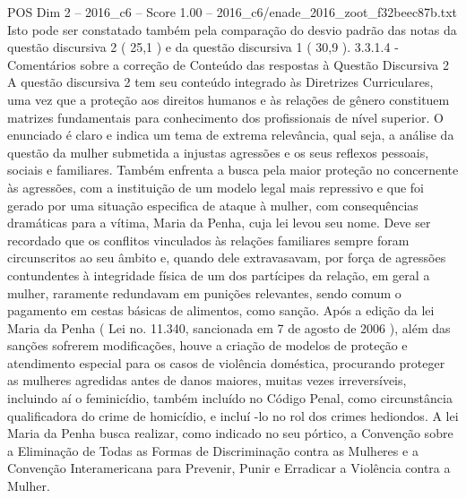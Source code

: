 \begin{textsample}{POS Dim 2 – 2016\_c6 – Score 1.00 – 2016\_c6/enade\_2016\_zoot\_f32beec87b.txt}
Isto pode ser constatado também pela comparação do desvio padrão das notas da questão discursiva 2 ( 25,1 ) e da questão discursiva 1 ( 30,9 ). 3.3.1.4 - Comentários sobre a correção de Conteúdo das respostas à Questão Discursiva 2 A questão discursiva 2 tem seu conteúdo integrado às Diretrizes Curriculares, uma vez que a proteção aos direitos humanos e às relações de gênero constituem matrizes fundamentais para conhecimento dos profissionais de nível superior.
O enunciado é claro e indica um tema de extrema relevância, qual seja, a análise da questão da mulher submetida a injustas agressões e os seus reflexos pessoais, sociais e familiares.
Também enfrenta a busca pela maior proteção no concernente às agressões, com a instituição de um modelo legal mais repressivo e que foi gerado por uma situação especifica de ataque à mulher, com consequências dramáticas para a vítima, Maria da Penha, cuja lei levou seu nome.
Deve ser recordado que os conflitos vinculados às relações familiares sempre foram circunscritos ao seu âmbito e, quando dele extravasavam, por força de agressões contundentes à integridade física de um dos partícipes da relação, em geral a mulher, raramente redundavam em punições relevantes, sendo comum o pagamento em cestas básicas de alimentos, como sanção.
Após a edição da lei Maria da Penha ( Lei no. 11.340, sancionada em 7 de agosto de 2006 ), além das sanções sofrerem modificações, houve a criação de modelos de proteção e atendimento especial para os casos de violência doméstica, procurando proteger as mulheres agredidas antes de danos maiores, muitas vezes irreversíveis, incluindo aí o feminicídio, também incluído no Código Penal, como circunstância qualificadora do crime de homicídio, e incluí -lo no rol dos crimes hediondos.
A lei Maria da Penha busca realizar, como indicado no seu pórtico, a Convenção sobre a Eliminação de Todas as Formas de Discriminação contra as Mulheres e a Convenção Interamericana para Prevenir, Punir e Erradicar a Violência contra a Mulher.

\end{textsample}
